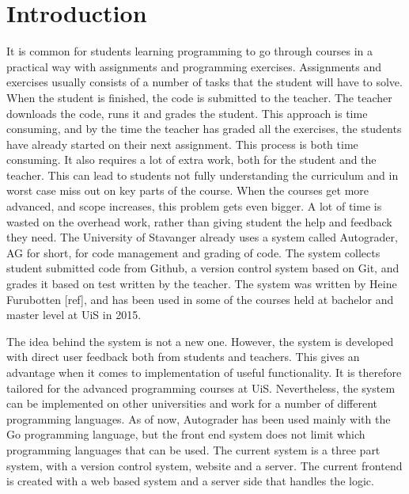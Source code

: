 \documentclass[12pt,a4paper]{report}
\begin{document}
\chapter*{Introduction}
It is common for students learning programming to go through courses in a practical way with assignments and programming exercises. Assignments and exercises usually consists of a number of tasks that the student will have to solve. When the student is finished, the code is submitted to the teacher. The teacher downloads the code, runs it and grades the student. This approach is time consuming, and by the time the teacher has graded all the exercises, the students have already started on their next assignment. This process is both time consuming. It also requires a lot of extra work, both for the student and the teacher. This can lead to students not fully understanding the curriculum and in worst case miss out on key parts of the course. When the courses get more advanced, and scope increases, this problem gets even bigger. A lot of time is wasted on the overhead work, rather than giving student the help and feedback they need. The University of Stavanger already uses a system called Autograder, AG for short, for code management and grading of code. The system collects student submitted code from Github, a version control system based on Git, and grades it based on test written by the teacher. The system was written by Heine Furubotten [ref], and has been used in some of the courses held at bachelor and master level at UiS in 2015.

The idea behind the system is not a new one. However, the system is developed with direct user feedback both from students and teachers. This gives an advantage when it comes to implementation of useful functionality. It is therefore tailored for the advanced programming courses at UiS. Nevertheless, the system can be implemented on other universities and work for a number of different programming languages. As of now, Autograder has been used mainly with the Go programming language, but the front end system does not limit which programming languages that can be used. The current system is a three part system, with a version control system, website and a server. The current frontend is created with a web based system and a server side that handles the logic. 
\end{document}
